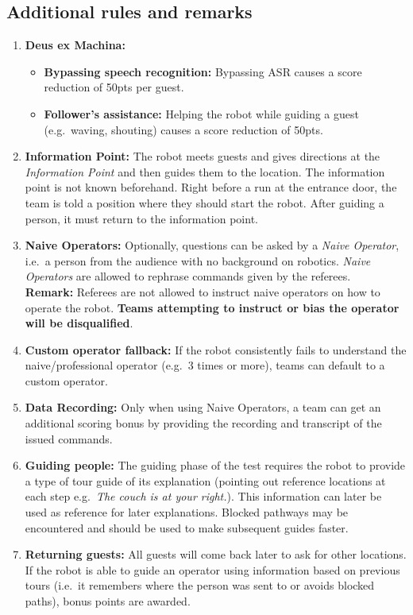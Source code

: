 \subsection*{Additional rules and remarks}
\begin{enumerate}[nosep]
	\item \textbf{Deus ex Machina:}
	\begin{itemize}[nosep]
		\item \textbf{Bypassing speech recognition:} Bypassing ASR causes a score reduction of 50pts per guest.

		\item \textbf{Follower's assistance:} Helping the robot while guiding a guest (e.g.~waving, shouting) causes a score reduction of 50pts.
	\end{itemize}

	\item \textbf{Information Point:} The robot meets guests and gives directions at the \emph{Information Point} and then guides them to the location. The information point is not known beforehand. Right before a run at the entrance door, the team is told a position where they should start the robot.
	After guiding a person, it must return to the information point.

	\item \textbf{Naive Operators:} Optionally, questions can be asked by a \emph{Naive Operator}, i.e.~a person from the audience with no background on robotics. \emph{Naive Operators} are allowed to rephrase commands given by the referees.
	\\\textbf{Remark:} Referees are not allowed to instruct naive operators on how to operate the robot. \textbf{Teams attempting to instruct or bias the operator will be disqualified}.

	\item \textbf{Custom operator fallback:} If the robot consistently fails to understand the naive/professional operator (e.g.~3 times or more), teams can default to a custom operator.
	
	\item \textbf{Data Recording:} Only when using Naive Operators, a team can get an additional scoring bonus by providing the recording and transcript of the issued commands.

	\item \textbf{Guiding people:} The guiding phase of the test requires the robot to provide a type of tour guide of its explanation (pointing out reference locations at each step e.g.~\emph{The couch is at your right.}). This information can later be used as reference for later explanations. Blocked pathways may be encountered and should be used to make subsequent guides faster.

	\item \textbf{Returning guests:} All guests will come back later to ask for other locations.
	If the robot is able to guide an operator using information based on previous tours (i.e.~it remembers where the person was sent to or avoids blocked paths), bonus points are awarded.
\end{enumerate}

